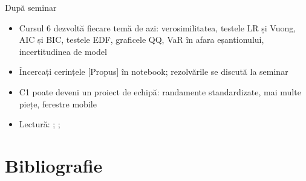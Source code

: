 \begin{frame}{După seminar}
\itemsize{\small}
\begin{itemize}
    \item Cursul 6 dezvoltă fiecare temă de azi: verosimilitatea, testele LR și Vuong, AIC și BIC, testele EDF, graficele QQ, VaR în afara eșantionului, incertitudinea de model
    \item Încercați cerințele [Propus] în notebook; rezolvările se discută la seminar
    \item C1 poate deveni un proiect de echipă: randamente standardizate, mai multe piețe, ferestre mobile
    \item Lectură: ; ; 
\end{itemize}
\end{frame}


\section{Bibliografie}

